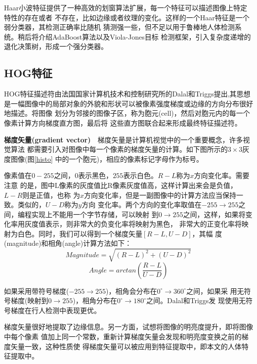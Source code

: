 Haar小波特征提供了一种高效的划窗算法扩展，每一个特征可以描述图像上特定特性的存在或者
不存在，比如边缘或者纹理的变化。这样的一个Haar特征是一个弱分类器，其检测正确率比随机
猜测强一些，但不足以用于鲁棒地人体检测系统。稍后将介绍AdaBoost算法以及Viola-Jones目标
检测框架，引入复杂度递增的退化决策树，形成一个强分类器。
\subsection{HOG特征}
HOG特征描述符由法国国家计算机技术和控制研究所的Dalal和Triggs提出\cite{DT2005},其思想
是一幅图像中的局部对象的外貌和形状可以被像素强度梯度或边缘的方向分布很好地描述。将图像
划分为邻接的图像子区，称为胞元(cell)，然后对胞元内的每一个像素计算方向梯度直方图，最后将
这些直方图联合起来形成最终特征描述符。


\textbf{梯度矢量(gradient vector)}~~梯度矢量是计算机视觉中的一个重要概念，许多视觉算法
都需要引入对图像中每一个像素的梯度矢量的计算。如下图所示的$3\times3$灰度图像(图\ref{histo}
中的一个胞元)，相应的像素标记字母作为标号。


像素值在$0-255$之间，$0$表示黑色，$255$表示白色。$R-L$称为$x$方向变化率。需要注意
的是，图中L像素的灰度值比R像素灰度值高，这样计算出来会是负值，$L-R$则是正值，也称
为$x$方向变化率，但是一副图像中的计算方法应当保持一致。类似的，$U-D$称为$y$方向
变化率。两个方向的变化率取值在$-255\to255$之间，编程实现上不能用一个字节存储，可以映射
到$0\to255$之间，这样，如果将变化率用灰度值表示，则非常大的负变化率将映射为黑色，
非常大的正变化率将映射为白色。同时，我们可以得到一个梯度矢量$[R-L,U-D]$，其幅
度(magnitude)和相角(angle)计算方法如下：
\begin{equation}
Magnitude=\sqrt{(R-L)^2+(U-D)^2}
\end{equation}
\begin{equation}
Angle=arctan\left(\frac{R-L}{U-D}\right)
\end{equation}

如果采用带符号梯度($-255\to255$)，相角会分布在$0^\circ\to360^\circ$之间，如果采
用无符号梯度(映射到$0\to255$)，相角分布在$0^\circ\to180^\circ$之间。Dalal和Triggs发
现使用无符号梯度在行人检测中表现更优\cite{DT2005}。

梯度矢量很好地提取了边缘信息。另一方面，试想将图像的明亮度提升，即将图像中每个像素
值加上同一个常数，重新计算梯度矢量会发现和明亮度变换之前的梯度矢量一致，这种性质使
得梯度矢量可以被应用到特征提取中，即本文的人体特征提取中。

